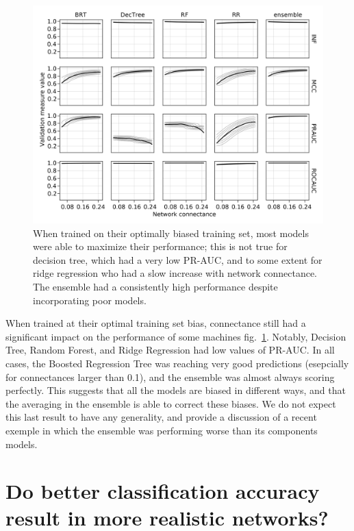 \documentclass[11pt]{article}
\makeatletter
\def\maxwidth{\ifdim\Gin@nat@width>\linewidth\linewidth
\else\Gin@nat@width\fi}
\let\Oldincludegraphics\includegraphics
\renewcommand{\includegraphics}[1]{\Oldincludegraphics[width=\maxwidth]{#1}}
\makeatother
\begin{document}
\begin{figure}
\hypertarget{fig:optimperf}{%
\centering
\includegraphics{figures/optim_perf.png}
\caption{When trained on their optimally biased training set, most
models were able to maximize their performance; this is not true for
decision tree, which had a very low PR-AUC, and to some extent for ridge
regression who had a slow increase with network connectance. The
ensemble had a consistently high performance despite incorporating poor
models.}\label{fig:optimperf}
}
\end{figure}

When trained at their optimal training set bias, connectance still had a
significant impact on the performance of some machines
fig.~\ref{fig:optimperf}. Notably, Decision Tree, Random Forest, and
Ridge Regression had low values of PR-AUC. In all cases, the Boosted
Regression Tree was reaching very good predictions (esepcially for
connectances larger than 0.1), and the ensemble was almost always
scoring perfectly. This suggests that all the models are biased in
different ways, and that the averaging in the ensemble is able to
correct these biases. We do not expect this last result to have any
generality, and provide a discussion of a recent exemple in which the
ensemble was performing worse than its components models.

\hypertarget{do-better-classification-accuracy-result-in-more-realistic-networks}{%
\section{Do better classification accuracy result in more realistic
networks?}\label{do-better-classification-accuracy-result-in-more-realistic-networks}}
\end{document}
